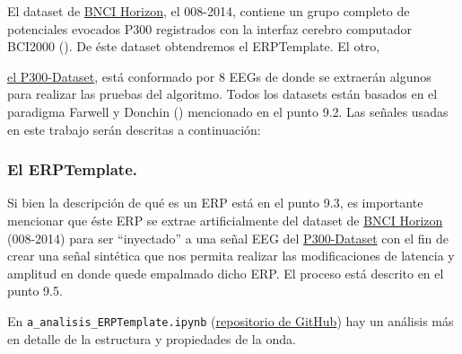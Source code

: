 \documentclass[../00_Main.tex]{subfiles}
\begin{document}
El dataset de \href{http://bnci-horizon-2020.eu/database/data-sets}{BNCI Horizon}, el 008-2014, contiene un grupo completo de potenciales evocados P300 registrados con la interfaz cerebro computador BCI2000 (\cite{schalk2004bci2000}). De éste dataset obtendremos el ERPTemplate. El otro, 

\href{https://www.kaggle.com/datasets/rramele/p300samplingdataset?resource=download}{el P300-Dataset}, está conformado por 8 EEGs de donde se extraerán algunos para realizar las pruebas del algoritmo. Todos los datasets están basados en el paradigma Farwell y Donchin (\cite{Talkinghead}) mencionado en el punto 9.2. Las señales usadas en este trabajo serán descritas a continuación:

\subsubsection{El ERPTemplate.}
Si bien la descripción de qué es un ERP está en el punto 9.3, es importante mencionar que éste ERP se extrae artificialmente del dataset de \href{http://bnci-horizon-2020.eu/database/data-sets}{BNCI Horizon} (008-2014) para ser “inyectado” a una señal EEG del \href{https://www.kaggle.com/datasets/rramele/p300samplingdataset?resource=download}{P300-Dataset} con el fin de crear una señal sintética que nos permita realizar las modificaciones de latencia y amplitud en donde quede empalmado dicho ERP.  El proceso está descrito en el punto 9.5. 

En \verb|a_analisis_ERPTemplate.ipynb| (\href{https://github.com/alexchavez1980/repo\_tesis}{repositorio de GitHub}) hay un análisis más en detalle de la estructura y propiedades de la onda.






\end{document}
